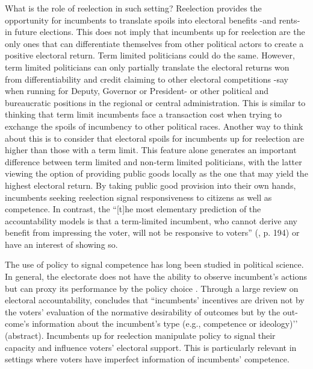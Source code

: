 \documentclass[12pt]{amsart}
\numberwithin{equation}{section}
\theoremstyle{definition}
\theoremstyle{definition}
\theoremstyle{definition}
\begin{document}
What is the role of reelection in such setting? Reelection provides the opportunity for incumbents to translate spoils into electoral benefits -and rents- in future elections. This does not imply that incumbents up for reelection are the only ones that can differentiate themselves from other political actors to create a positive electoral return. Term limited politicians could do the same. However, term limited politicians can only partially translate the electoral returns won from differentiability and credit claiming to other electoral competitions -say when running for Deputy, Governor or President- or other political and bureaucratic positions in the regional or central administration. This is similar to thinking that term limit incumbents face a transaction cost when trying to exchange the spoils of incumbency to other political races. Another way to think about this is to consider that electoral spoils for incumbents up for reelection are higher than those with a term limit. This feature alone generates an important difference between term limited and non-term limited politicians, with the latter viewing the option of providing public goods locally as the one that may yield the highest electoral return. By taking public good provision into their own hands, incumbents seeking reelection signal responsiveness to citizens as well as competence. In contrast, the ``[t]he most elementary prediction of the accountability models is that a term-limited incumbent, who cannot derive any benefit from impressing the voter, will not be responsive to voters” (\citet{ashworth_2012}, p. 194) or have an interest of showing so.

The use of policy to signal competence has long been studied in political science. In general, the electorate does not have the ability to observe incumbent’s actions but can proxy its performance by the policy choice \citep{ferejohn_1986}. Through a large review on electoral accountability, \citet{ashworth_2012} concludes that ``incumbents’ incentives are driven not by the voters’ evaluation of the normative desirability of outcomes but by the out- come’s information about the incumbent’s type (e.g., competence or ideology)’’ (abstract). Incumbents up for reelection manipulate policy to signal their capacity and influence voters’ electoral support. This is particularly relevant in settings where voters have imperfect information of incumbents’ competence.%
\end{document}
